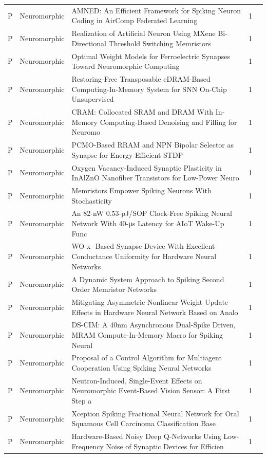 \documentclass[10pt]{article}
\begin{document}
\begin{longtable}{@{}llL{8.6cm}lL{4.2cm}@{}}
P & Neuromorphic & AMNED: An Efficient Framework for Spiking Neuron Coding in AirComp Federated Learning & 1 &  \\
P & Neuromorphic & Realization of Artificial Neuron Using MXene Bi-Directional Threshold Switching Memristors & 1 &  \\
P & Neuromorphic & Optimal Weight Models for Ferroelectric Synapses Toward Neuromorphic Computing & 1 &  \\
P & Neuromorphic & Restoring-Free Transposable eDRAM-Based Computing-In-Memory System for SNN On-Chip Unsupervised & 1 &  \\
P & Neuromorphic & CRAM: Collocated SRAM and DRAM With In-Memory Computing-Based Denoising and Filling for Neuromo & 1 &  \\
P & Neuromorphic & PCMO-Based RRAM and NPN Bipolar Selector as Synapse for Energy Efficient STDP & 1 &  \\
P & Neuromorphic & Oxygen Vacancy-Induced Synaptic Plasticity in InAlZnO Nanofiber Transistors for Low-Power Neuro & 1 &  \\
P & Neuromorphic & Memristors Empower Spiking Neurons With Stochasticity & 1 &  \\
P & Neuromorphic & An 82-nW 0.53-pJ/SOP Clock-Free Spiking Neural Network With 40-μs Latency for AIoT Wake-Up Func & 1 &  \\
P & Neuromorphic & WO x -Based Synapse Device With Excellent Conductance Uniformity for Hardware Neural Networks & 1 &  \\
P & Neuromorphic & A Dynamic System Approach to Spiking Second Order Memristor Networks & 1 &  \\
P & Neuromorphic & Mitigating Asymmetric Nonlinear Weight Update Effects in Hardware Neural Network Based on Analo & 1 &  \\
P & Neuromorphic & DS-CIM: A 40nm Asynchronous Dual-Spike Driven, MRAM Compute-In-Memory Macro for Spiking Neural  & 1 &  \\
P & Neuromorphic & Proposal of a Control Algorithm for Multiagent Cooperation Using Spiking Neural Networks & 1 &  \\
P & Neuromorphic & Neutron-Induced, Single-Event Effects on Neuromorphic Event-Based Vision Sensor: A First Step a & 1 &  \\
P & Neuromorphic & Xception Spiking Fractional Neural Network for Oral Squamous Cell Carcinoma Classification Base & 1 &  \\
P & Neuromorphic & Hardware-Based Noisy Deep Q-Networks Using Low-Frequency Noise of Synaptic Devices for Efficien & 1 &  \\

\end{longtable}
\end{document}
